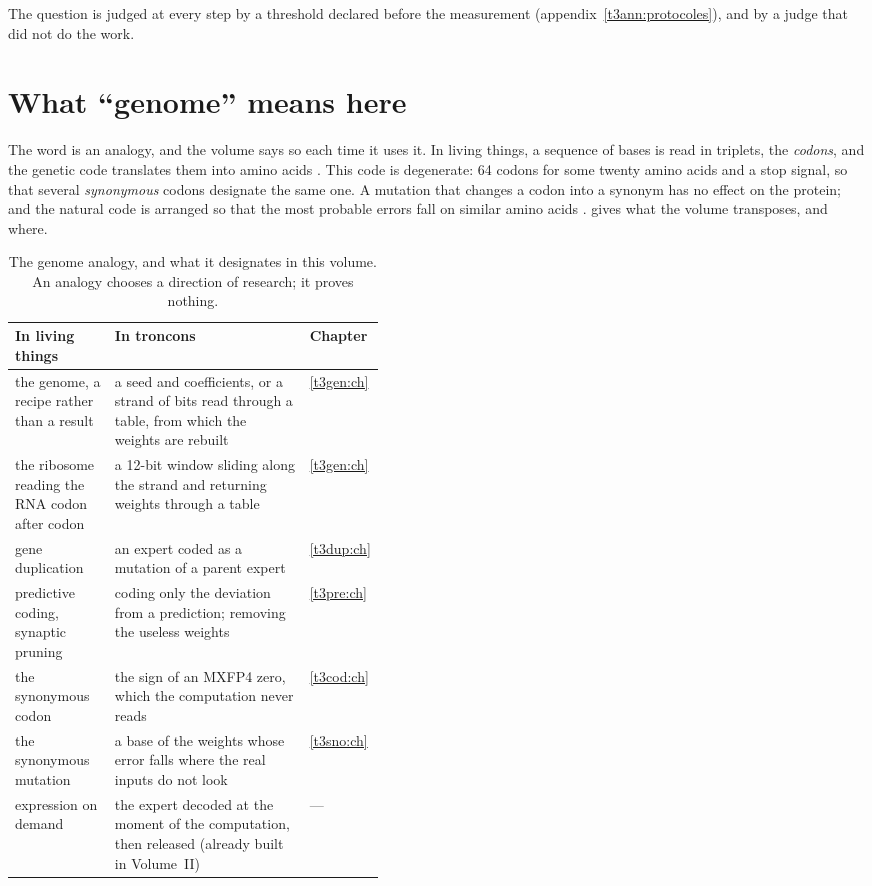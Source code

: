 The question is judged at every step by a threshold declared before the measurement (appendix~\ref{t3ann:protocoles}), and by a judge that did not do the work.

\section{What ``genome'' means here}\label{t3int:sec:genome}

The word is an analogy, and the volume says so each time it uses it. In living things, a sequence of bases is read in triplets, the \emph{codons}, and the genetic code translates them into amino acids \parencite{genome-crick1961}. This code is degenerate: 64 codons for some twenty amino acids and a stop signal, so that several \emph{synonymous} codons designate the same one. A mutation that changes a codon into a synonym has no effect on the protein; and the natural code is arranged so that the most probable errors fall on similar amino acids \parencite{genome-crick1968,freeland1998}.  gives what the volume transposes, and where.

\begin{table}[ht]
\centering\footnotesize
\caption[The genome analogy, and what it designates here]{The genome analogy, and what it designates in this volume. An analogy chooses a direction of research; it proves nothing.}
\label{t3int:tab:analogie}
\begin{tabularx}{\linewidth}{@{}>{\raggedright\arraybackslash}p{0.27\linewidth}>{\raggedright\arraybackslash}X>{\raggedright\arraybackslash}p{0.16\linewidth}@{}}
\toprule
In living things & In troncons & Chapter \\
\midrule
the genome, a recipe rather than a result & a seed and coefficients, or a strand of bits read through a table, from which the weights are rebuilt & \cref{t3gen:ch} \\
the ribosome reading the RNA codon after codon & a 12-bit window sliding along the strand and returning weights through a table & \cref{t3gen:ch} \\
gene duplication & an expert coded as a mutation of a parent expert & \cref{t3dup:ch} \\
predictive coding, synaptic pruning & coding only the deviation from a prediction; removing the useless weights & \cref{t3pre:ch} \\
the synonymous codon & the sign of an MXFP4 zero, which the computation never reads & \cref{t3cod:ch} \\
the synonymous mutation & a base of the weights whose error falls where the real inputs do not look & \cref{t3sno:ch} \\
expression on demand & the expert decoded at the moment of the computation, then released (already built in Volume~II) & --- \\
\bottomrule
\end{tabularx}
\end{table}

